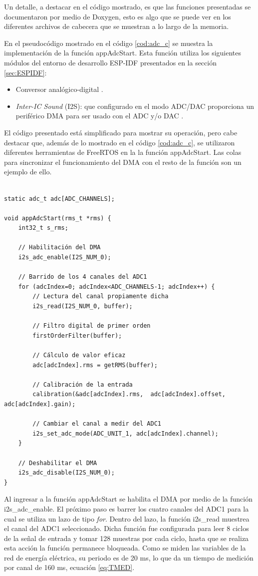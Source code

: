 Un detalle, a destacar en el código mostrado, es que las funciones presentadas se documentaron por medio de Doxygen, esto es algo que se puede ver en los diferentes archivos de cabecera que se muestran a lo largo de la memoria.

En el pseudocódigo mostrado en el código \ref{cod:adc_c} se muestra la implementación de la función appAdcStart. Esta función utiliza los siguientes módulos del entorno de desarrollo ESP-IDF presentados en la sección \ref{sec:ESPIDF}: 
\begin{itemize}
\item Conversor analógico-digital \citep{ADC}.
\item \textit{Inter-IC Sound} (I2S): que configurado en el modo ADC/DAC proporciona un periférico DMA para ser usado con el ADC y/o DAC \citep{I2S}.
\end{itemize}

El código presentado está simplificado para mostrar su operación, pero cabe destacar que, además de lo mostrado en el código \ref{cod:adc_c}, se utilizaron diferentes herramientas de FreeRTOS en la la función appAdcStart. Las colas para sincronizar el funcionamiento del DMA con el resto de la función son un ejemplo de ello.

\begin{lstlisting}[label=cod:adc_c,caption=Pseudocódigo del módulo adc.c.]

static adc_t adc[ADC_CHANNELS];

void appAdcStart(rms_t *rms) {
	int32_t s_rms;
	
	// Habilitación del DMA 
	i2s_adc_enable(I2S_NUM_0);

	// Barrido de los 4 canales del ADC1
	for (adcIndex=0; adcIndex<ADC_CHANNELS-1; adcIndex++) {		
		// Lectura del canal propiamente dicha
		i2s_read(I2S_NUM_0, buffer);
		
		// Filtro digital de primer orden
		firstOrderFilter(buffer);

		// Cálculo de valor eficaz
		adc[adcIndex].rms = getRMS(buffer);
		
		// Calibración de la entrada 
		calibration(&adc[adcIndex].rms,  adc[adcIndex].offset, adc[adcIndex].gain);
		
		// Cambiar el canal a medir del ADC1
		i2s_set_adc_mode(ADC_UNIT_1, adc[adcIndex].channel);
	}
	
	// Deshabilitar el DMA
	i2s_adc_disable(I2S_NUM_0);
}
\end{lstlisting}

Al ingresar a la función appAdcStart se habilita el DMA por medio de la función i2s\_adc\_enable. El próximo paso es barrer los cuatro canales del ADC1 para la cual se utiliza un lazo de tipo \textit{for}. Dentro del lazo, la función i2s\_read muestrea el canal del ADC1 seleccionado. Dicha función fue configurada para leer 8 ciclos de la señal de entrada y tomar 128 muestras por cada ciclo, hasta que se realiza esta acción la función permanece bloqueada. Como se miden las variables de la red de energía eléctrica, su periodo es de 20 ms, lo que da un tiempo de medición por canal de 160 ms, ecuación \ref{eq:TMED}.


